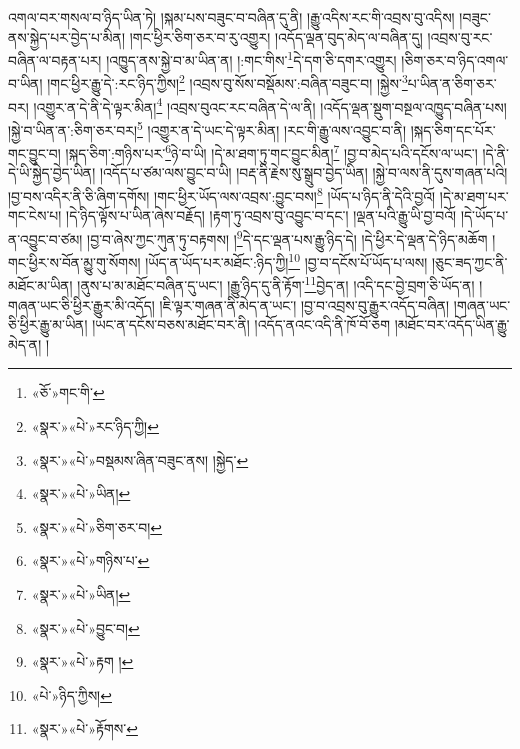 འགལ་བར་གསལ་བ་ཉིད་ཡིན་ཏེ། །སྐམ་པས་བཟུང་བ་བཞིན་དུ་ནི། །རྒྱུ་འདིས་རང་གི་འབྲས་བུ་འདིས། །བཟུང་ནས་སྐྱེད་པར་བྱེད་པ་མིན། །གང་ཕྱིར་ཅིག་ཅར་བ་རུ་འགྱུར། །འདོད་ལྡན་བུད་མེད་ལ་བཞིན་དུ། །འབྲས་བུ་རང་བཞིན་ལ་བརྟན་པར། །འཁྱུད་ནས་སྐྱེ་བ་མ་ཡིན་ན། །:གང་གིས་\footnote{«ཅོ་»གང་གི་}དེ་དག་ཅི་དགར་འགྱུར། །ཅིག་ཅར་བ་ཉིད་འགལ་བ་ཡིན། །གང་ཕྱིར་རྒྱུ་དེ་:རང་ཉིད་ཀྱིས།\footnote{«སྣར་»«པེ་»རང་ཉིད་ཀྱི།} །འབྲས་བུ་སོས་བསྡོམས་:བཞིན་བཟུང་བ། །སྐྱེས་\footnote{«སྣར་»«པེ་»བསྡམས་ཞིན་བཟུང་ནས། །སྐྱེད་}པ་ཡིན་ན་ཅིག་ཅར་བར། །འགྱུར་ན་དེ་ནི་དེ་ལྟར་མིན།\footnote{«སྣར་»«པེ་»ཡིན།} །འབྲས་བུའང་རང་བཞིན་དེ་ལ་ནི། །འདོད་ལྡན་སྡུག་བསྔལ་འཁྱུད་བཞིན་པས། །སྐྱེ་བ་ཡིན་ན་:ཅིག་ཅར་བར།\footnote{«སྣར་»«པེ་»ཅིག་ཅར་བ།} །འགྱུར་ན་དེ་ཡང་དེ་ལྟར་མིན། །རང་གི་རྒྱུ་ལས་འབྱུང་བ་ནི། །སྐད་ཅིག་དང་པོར་གང་བྱུང་བ། །སྐད་ཅིག་:གཉིས་པར་\footnote{«སྣར་»«པེ་»གཉིས་པ་}ཉེ་བ་ཡི། །དེ་མ་ཐག་ཏུ་གང་བྱུང་མིན།\footnote{«སྣར་»«པེ་»ཡིན།} །བྱ་བ་མེད་པའི་དངོས་ལ་ཡང་། །དེ་ནི་དེ་ཡི་སྐྱེད་བྱེད་ཡིན། །འདོད་པ་ཙམ་ལས་བྱུང་བ་ཡི། །བརྡ་ནི་རྗེས་སུ་སྒྲུབ་བྱེད་ཡིན། །སྐྱེ་བ་ལས་ནི་དུས་གཞན་པའི། །བྱ་བས་འདིར་ནི་ཅི་ཞིག་དགོས། །གང་ཕྱིར་ཡོད་ལས་འབྲས་:བྱུང་བས།\footnote{«སྣར་»«པེ་»བྱུང་བ།} །ཡོད་པ་ཉིད་ནི་དེའི་བྱའོ། །དེ་མ་ཐག་པར་གང་ངེས་པ། །དེ་ཉིད་ལྟོས་པ་ཡིན་ཞེས་བརྗོད། །རྟག་ཏུ་འབྲས་བུ་འབྱུང་བ་དང་། །ལྡན་པའི་རྒྱུ་ཡི་བྱ་བའོ། །དེ་ཡོད་པ་ན་འབྱུང་བ་ཙམ། །བྱ་བ་ཞེས་ཀྱང་ཀུན་ཏུ་བརྟགས། །\footnote{«སྣར་»«པེ་»རྟག །}དེ་དང་ལྡན་པས་རྒྱུ་ཉིད་དེ། །དེ་ཕྱིར་དེ་ལྡན་དེ་ཉིད་མཆོག །གང་ཕྱིར་ས་བོན་མྱུ་གུ་སོགས། །ཡོད་ན་ཡོད་པར་མཐོང་:ཉིད་ཀྱི།\footnote{«པེ་»ཉིད་ཀྱིས།} །བྱ་བ་དངོས་པོ་ཡོད་པ་ལས། །ཅུང་ཟད་ཀྱང་ནི་མཐོང་མ་ཡིན། །ནུས་པ་མ་མཐོང་བཞིན་དུ་ཡང་། །རྒྱུ་ཉིད་དུ་ནི་རྟོག་\footnote{«སྣར་»«པེ་»རྟོགས་}བྱེད་ན། །འདི་དང་བྱེ་བྲག་ཅི་ཡོད་ན། །གཞན་ཡང་ཅི་ཕྱིར་རྒྱུར་མི་འདོད། །ཇི་ལྟར་གཞན་ནི་མེད་ན་ཡང་། །བྱ་བ་འབྲས་བུ་རྒྱུར་འདོད་བཞིན། །གཞན་ཡང་ཅི་ཕྱིར་རྒྱུ་མ་ཡིན། །ཡང་ན་དངོས་བཅས་མཐོང་བར་ནི། །འདོད་ནའང་འདི་ནི་ཁོ་བོ་ཅག །མཐོང་བར་འདོད་ཡིན་རྒྱུ་མེད་ན། །
